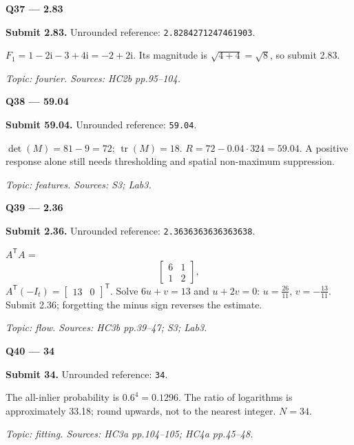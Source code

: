 \documentclass[11pt,a4paper]{article}
\begin{document}
\par\vspace{12pt}
\begin{minipage}{\linewidth}
\textbf{Q37 — 2.83}\par\smallskip
\textbf{Submit 2.83.} Unrounded reference: \texttt{2.8284271247461903}.\par
\(F_1=1-2\mathrm{i}-3+4\mathrm{i}=-2+2\mathrm{i}\). Its magnitude is \(\sqrt{4+4}=\sqrt{8}\),\allowbreak{} so submit 2.83.\par
{\small\itshape Topic: fourier. Sources: HC2b pp.95–104.}

\end{minipage}
\par\vspace{12pt}
\begin{minipage}{\linewidth}
\textbf{Q38 — 59.04}\par\smallskip
\textbf{Submit 59.04.} Unrounded reference: \texttt{59.04}.\par
\(\det(M)=81-9=72\); \(\operatorname{tr}(M)=18\). \(R=72-0.04\cdot324=59.04\). A positive response alone still needs thresholding and spatial non-maximum suppression.\par
{\small\itshape Topic: features. Sources: S3; Lab3.}

\end{minipage}
\par\vspace{12pt}
\begin{minipage}{\linewidth}
\textbf{Q39 — 2.36}\par\smallskip
\textbf{Submit 2.36.} Unrounded reference: \texttt{2.3636363636363638}.\par
\(A^{\mathsf T}A\) =\allowbreak{}
\[\begin{bmatrix}6&1\\1&2\end{bmatrix},\]
 \(A^{\mathsf T}(-I_t)=\begin{bmatrix}13&0\end{bmatrix}^{\mathsf T}\). Solve \(6u+v=13\) and \(u+2v=0\): \(u=\frac{26}{11}\),\allowbreak{} \(v=-\frac{13}{11}\). Submit 2.36; forgetting the minus sign reverses the estimate.\par
{\small\itshape Topic: flow. Sources: HC3b pp.39–47; S3; Lab3.}

\end{minipage}
\par\vspace{12pt}
\begin{minipage}{\linewidth}
\textbf{Q40 — 34}\par\smallskip
\textbf{Submit 34.} Unrounded reference: \texttt{34}.\par
The all-inlier probability is \(0.6^4=0.1296\). The ratio of logarithms is approximately 33.18; round upwards,\allowbreak{} not to the nearest integer. \(N=34\).\par
{\small\itshape Topic: fitting. Sources: HC3a pp.104–105; HC4a pp.45–48.}

\end{minipage}
\end{document}
